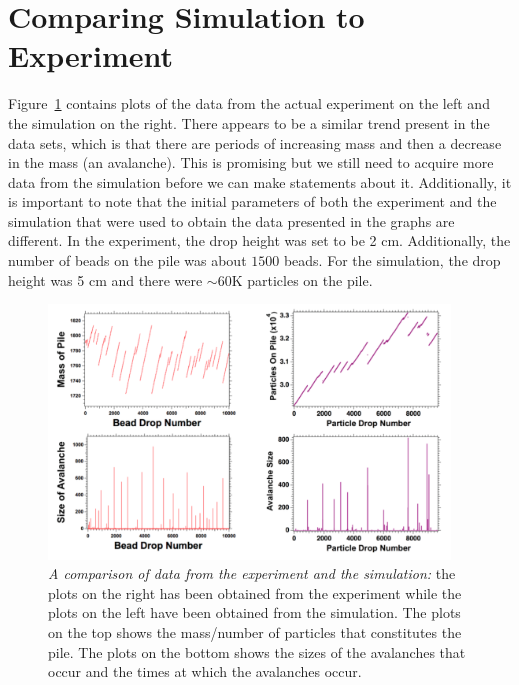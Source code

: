 \documentclass{book}
\begin{document}
\section{Comparing Simulation to Experiment}
Figure~\ref{fig:comparingData} contains plots of the data from the actual experiment on the left and the simulation on the right. There appears to be a similar trend present in the data sets, which is that there are periods of increasing mass and then a decrease in the mass (an avalanche). This is promising but we still need to acquire more data from the simulation before we can make statements about it.  Additionally, it is important to note that the initial parameters of both the experiment and the simulation that were used to obtain the data presented in the graphs are different. In the experiment, the drop height was set to be 2 cm. Additionally, the number of beads on the pile was about $1500$ beads. For the simulation, the drop height was 5 cm and there were $\sim60$K particles on the pile. 
\begin{figure}[h]
	\centering
	\includegraphics[width=0.95\textwidth]{Figures/Results/comparingData/origComparision}
	\caption[Comparing experiment and simulation data]{\textit{A comparison of data from the experiment and the simulation:} the plots on the right has been obtained from the experiment while the plots on the left have been obtained from the simulation. The plots on the top shows the mass/number of particles that constitutes the pile. The plots on the bottom shows the sizes of the avalanches that occur and the times at which the avalanches occur.}
	\label{fig:comparingData}
\end{figure}
\end{document}
